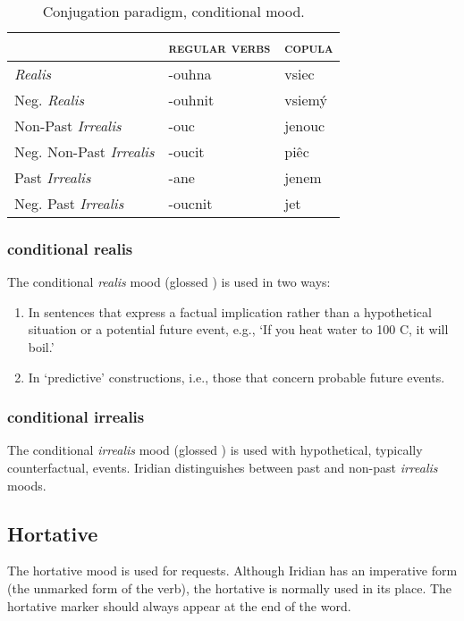 \begin{table}[h!]
	\centering \small
	\caption{Conjugation paradigm, conditional mood.}
	\begin{tabu} to 0.9 \textwidth	{Y[1.3]MM}
		\toprule
		&{\scshape regular verbs} & {\scshape copula}\\
		\midrule
		
		\textit{Realis} &-ouhna&vsiec\\
		Neg. \textit{Realis}&-ouhnit&vsiemý\\
		
		Non-Past \textit{Irrealis} & -ouc & jenouc\\
		Neg. Non-Past \textit{Irrealis} & -oucit& piêc\\
		
		Past \textit{Irrealis} & -ane & jenem\\
		Neg. Past \textit{Irrealis} & -oucnit & jet\\
		\bottomrule
	\end{tabu}
\end{table}

\subsubsection{conditional realis}

\par The conditional \textit{realis} mood (glossed ) is used in two ways:
\begin{enumerate}
	\item In sentences that express a factual implication rather than a hypothetical situation or a potential future event, e.g., `If you heat water to 100 C, it will boil.'
	\item In `predictive' constructions, i.e., those that concern probable future events.
\end{enumerate} 

\subsubsection{conditional irrealis}
The conditional \textit{irrealis} mood (glossed ) is used with hypothetical, typically counterfactual, events. Iridian distinguishes between past and non-past \textit{irrealis} moods.


\subsection{Hortative}
\par The hortative mood is used for requests. Although Iridian has an imperative form (the unmarked form of the verb), the hortative is normally used in its place. The hortative marker should always appear at the end of the word.

